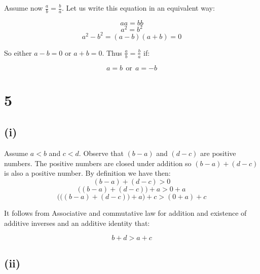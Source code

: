\documentclass{article}
\begin{document}
Assume now \(\frac{a}{b} = \frac{b}{a}\). Let us write this equation in an equivalent way:

\begin{equation*}
	aa = bb
\end{equation*}
\begin{equation*}
	a^{2} = b^{2}
\end{equation*}
\begin{equation*}
	a^{2} - b^{2} = (a-b)(a+b) = 0
\end{equation*}

So either \(a - b = 0\) or \(a + b = 0\). Thus \(\frac{a}{b} = \frac{b}{a}\) if:

\begin{equation*}
	a = b \ \ \mbox{or} \ \ a = -b
\end{equation*}

\section*{5}

\subsection*{(i)}

Assume \(a < b\) and \(c < d\). Observe that \((b - a)\) and \((d - c)\) are
positive numbers. The positive numbers are closed under addition so \((b - a) + (d - c)\)
is also a positive number. By definition we have then:
\begin{equation*}
	(b - a) + (d - c) > 0
\end{equation*} 
\begin{equation*}
	\Big((b - a) + (d - c)\Big) + a > 0 + a
\end{equation*}
\begin{equation*}
	\Bigg(\Big((b - a) + (d - c)\Big) + a\Bigg) + c > (0 + a) + c
\end{equation*}

It follows from Associative and commutative law for addition and existence of additive inverses and an
additive identity that:

\begin{equation*}
	b + d > a + c
\end{equation*}


\subsection*{(ii)}
\end{document}
